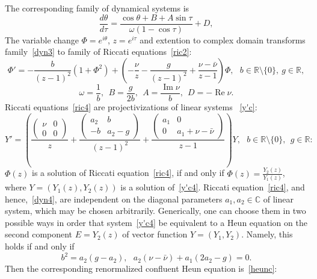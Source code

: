 \documentclass[preprint,12pt]{elsarticle}
\theoremstyle{plain}
\DeclareMathOperator{\im}{\mathrm{Im}}
\DeclareMathOperator{\re}{\mathrm{Re}}
\numberwithin{equation}{section}
\numberwithin{equation}{section}
\begin{document}
The corresponding family of dynamical systems is
\begin{equation}\label{dyn4}
    \frac{d\theta}{d\tau}=\frac{\cos\theta+B+A\sin\tau}{\omega(1-\cos\tau)}+D,
\end{equation}
The variable change $\Phi=e^{i\theta}$, $z=e^{i\tau}$ 
and extention to complex domain transforms family~\eqref{dyn3} to family of Riccati equations~\eqref{ric2}: 
\begin{equation}\label{ric4}
    \Phi'=-\frac{b}{(z-1)^2}(1+\Phi^2)+\left(-\frac{\nu}{z}-\frac{g}{(z-1)^2}+\frac{\nu-\bar\nu}{z-1}\right)\Phi, \ \  \ b\in\mathbb R\setminus\{0\}, \ g\in\mathbb{R},
\end{equation}
\begin{equation}\label{confcs4}
    \omega=\frac{1}{b}, \ \ B=\frac{g}{2b}, \ \ A=\frac{\im\nu}{b}, \ \ D=-\re\nu.
\end{equation}
Riccati equations~\eqref{ric4} are projectivizations of linear systems 
~\eqref{y'c}: 
\begin{equation} Y'=\left(\frac{\left(\begin{matrix}\nu & 0\\ 0 & 0\end{matrix}\right)}z+
\frac{\left(\begin{matrix}a_2 & b\\ - b & a_2-g\end{matrix}\right)}{(z-1)^2}  + \frac{\left(\begin{matrix} 
a_1 & 0\\ 0 & a_1+\nu-\bar\nu\end{matrix}\right)}{z-1}\right)Y, \ \ \ b\in\mathbb{R}\setminus\{0\}, \ \ g\in\mathbb{R}:\label{y'c4}\end{equation}
$\Phi(z)$ is a solution of Riccati equation~\eqref{ric4}, if and only if $\Phi(z)=\frac{Y_2(z)}{Y_1(z)}$, where 
$Y=(Y_1(z), Y_2(z))$ is a solution of~\eqref{y'c4}. Riccati equation~\eqref{ric4}, and hence,~\eqref{dyn4}, are independent on the diagonal parameters $a_1,a_2\in\mathbb{C}$ of linear system, which may be chosen arbitrarily. 
Generically, one can choose them in two possible ways in order that system~\eqref{y'c4} be equivalent to a Heun equation on the second component 
 $E=Y_2(z)$ of vector function $Y=(Y_1,Y_2)$. Namely, this holds if and only if
\begin{equation} b^2=a_2(g-a_2), \ \ \ a_2(\nu-\bar\nu)+a_1(2a_2-g)=0.\label{ech4}\end{equation}
Then the corresponding renormalized confluent Heun equation is~\eqref{heunc}: 
\end{document}
